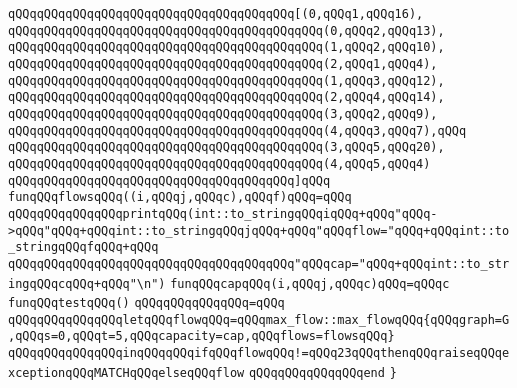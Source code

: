 \verb|qQQqqQQqqQQqqQQqqQQqqQQqqQQqqQQqqQQqqQQq[(0,qQQq1,qQQq16),|\newline
\verb|qQQqqQQqqQQqqQQqqQQqqQQqqQQqqQQqqQQqqQQqqQQq(0,qQQq2,qQQq13),|\newline
\verb|qQQqqQQqqQQqqQQqqQQqqQQqqQQqqQQqqQQqqQQqqQQq(1,qQQq2,qQQq10),|\newline
\verb|qQQqqQQqqQQqqQQqqQQqqQQqqQQqqQQqqQQqqQQqqQQq(2,qQQq1,qQQq4),|\newline
\verb|qQQqqQQqqQQqqQQqqQQqqQQqqQQqqQQqqQQqqQQqqQQq(1,qQQq3,qQQq12),|\newline
\verb|qQQqqQQqqQQqqQQqqQQqqQQqqQQqqQQqqQQqqQQqqQQq(2,qQQq4,qQQq14),|\newline
\verb|qQQqqQQqqQQqqQQqqQQqqQQqqQQqqQQqqQQqqQQqqQQq(3,qQQq2,qQQq9),|\newline
\verb|qQQqqQQqqQQqqQQqqQQqqQQqqQQqqQQqqQQqqQQqqQQq(4,qQQq3,qQQq7),qQQq|\newline
\verb|qQQqqQQqqQQqqQQqqQQqqQQqqQQqqQQqqQQqqQQqqQQq(3,qQQq5,qQQq20),|\newline
\verb|qQQqqQQqqQQqqQQqqQQqqQQqqQQqqQQqqQQqqQQqqQQq(4,qQQq5,qQQq4)|\newline
\verb|qQQqqQQqqQQqqQQqqQQqqQQqqQQqqQQqqQQqqQQq]qQQq|\newline
\verb|funqQQqflowsqQQq((i,qQQqj,qQQqc),qQQqf)qQQq=qQQq|\newline
\verb|qQQqqQQqqQQqqQQqprintqQQq(int::to_stringqQQqiqQQq+qQQq"qQQq->qQQq"qQQq+qQQqint::to_stringqQQqjqQQq+qQQq"qQQqflow="qQQq+qQQqint::to_stringqQQqfqQQq+qQQq|\newline
\verb|qQQqqQQqqQQqqQQqqQQqqQQqqQQqqQQqqQQqqQQq"qQQqcap="qQQq+qQQqint::to_stringqQQqcqQQq+qQQq"\n")|\newline
\newline
\verb|funqQQqcapqQQq(i,qQQqj,qQQqc)qQQq=qQQqc|\newline
\newline
\verb|funqQQqtestqQQq()|\newline
\verb|qQQqqQQqqQQqqQQq=qQQq|\newline
\verb|qQQqqQQqqQQqqQQqletqQQqflowqQQq=qQQqmax_flow::max_flowqQQq{qQQqgraph=G,qQQqs=0,qQQqt=5,qQQqcapacity=cap,qQQqflows=flowsqQQq}|\newline
\verb|qQQqqQQqqQQqqQQqinqQQqqQQqifqQQqflowqQQq!=qQQq23qQQqthenqQQqraiseqQQqexceptionqQQqMATCHqQQqelseqQQqflow|\newline
\verb|qQQqqQQqqQQqqQQqend|\newline
\newline
\verb|}|\newline

